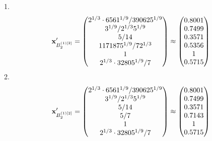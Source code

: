 \documentclass[10pt,a4paper]{article}
\begin{document}
	1.
	\[
		\bold{x}'_{B_2^{(1)[2]}} = 
		\begin{pmatrix}
			{{2^ {1 / 3}} \cdot {6561^ {1 / 9}}} / {{390625^ {1 / 9}}} \\
			{{3^ {1 / 9}}} / {{2^ {1 / 3}}{5^ {1 / 9}}} \\
			{{5}} / {{14}} \\
			{{1171875^ {1 / 9}}} / {{7}{2^ {1 / 3}}} \\
			{1}{} \\
			{{2^ {1 / 3}} \cdot {32805^ {1 / 9}}} / {{7}} \\
		\end{pmatrix}
		\approx
		\begin{pmatrix}
			0.8001   \\
			0.7499   \\
			0.3571   \\
			0.5356   \\
			1        \\
			0.5715   \\
		\end{pmatrix}
	\]
	2.
	\[
		\bold{x}'_{B_2^{(1)[2]}} = 
		\begin{pmatrix}
			{{2^ {1 / 3}} \cdot {6561^ {1 / 9}}} / {{390625^ {1 / 9}}} \\
			{{3^ {1 / 9}}} / {{2^ {1 / 3}}{5^ {1 / 9}}} \\
			{{5}} / {{14}} \\
			{{5}} / {{7}} \\
			{1}{} \\
			{{2^ {1 / 3}} \cdot {32805^ {1 / 9}}} / {{7}} \\
		\end{pmatrix}
		\approx
		\begin{pmatrix}
			0.8001   \\
			0.7499   \\
			0.3571   \\
			0.7143   \\
			1        \\
			0.5715   \\
		\end{pmatrix}
	\]
\end{document}
